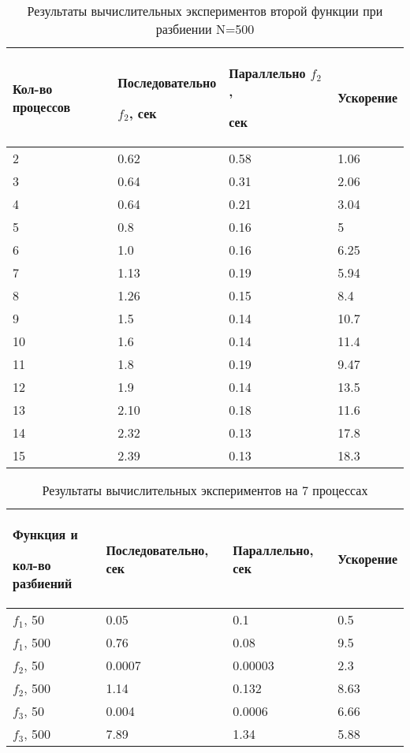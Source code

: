 \documentclass{report}
\begin{document}
\begin{table}[h]
    \begin{tabular}{ | p{4cm} | p{4cm} | p{4cm} | p{4cm} | }
    \hline
    Кол-во процессов & Последовательно \par $f_2$, сек & Параллельно $f_2$ ,\par сек & Ускорение\\ \hline
    2    & 0.62 & 0.58  &1.06 \\ \hline
    3    & 0.64 & 0.31  &2.06\\ \hline
    4    & 0.64 & 0.21  &3.04\\ \hline
    5    & 0.8  & 0.16 &5 \\ \hline 
    6    & 1.0  & 0.16 &6.25 \\ \hline
    7    & 1.13 & 0.19 &5.94 \\ \hline
    8    & 1.26 & 0.15 &8.4 \\ \hline
    9    & 1.5  & 0.14 &10.7\\ \hline
    10   & 1.6  & 0.14 &11.4 \\ \hline
    11   & 1.8  & 0.19 &9.47 \\ \hline
    12   & 1.9  & 0.14 &13.5 \\ \hline
    13   & 2.10 & 0.18 &11.6 \\ \hline
    14   & 2.32 & 0.13 &17.8 \\ \hline
    15   & 2.39 & 0.13 &18.3 \\ \hline
    \end{tabular}
    \caption{Результаты вычислительных экспериментов второй функции при разбиении N=500}
\end{table}

\begin{table}[h]
    \begin{tabular}{ | p{4cm} | p{4cm} | p{4cm} | p{4cm} | }
    \hline
    Функция и\par кол-во разбиений & Последовательно, сек & Параллельно, сек & Ускорение\\ \hline 
    $f_1$, 50  & 0.05   & 0.1     &0.5 \\ \hline
    $f_1$, 500 & 0.76   & 0.08    &9.5\\ \hline
    $f_2$, 50  & 0.0007 & 0.00003 &2.3\\ \hline
    $f_2$, 500 & 1.14   & 0.132   &8.63 \\ \hline 
    $f_3$, 50  & 0.004  & 0.0006  &6.66 \\ \hline
    $f_3$, 500 & 7.89   & 1.34    &5.88 \\ \hline
    \end{tabular}
    \caption{Результаты вычислительных экспериментов на 7 процессах}
\end{table}
\end{document}

